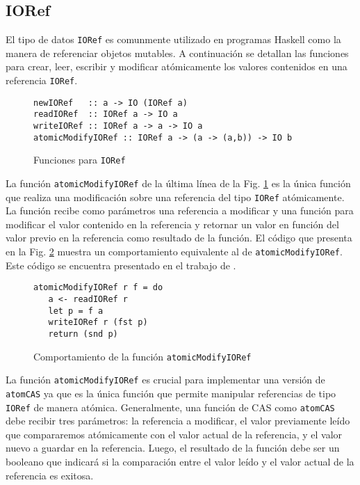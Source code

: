 \subsection{IORef}\label{sub:ioref}
El tipo de datos \texttt{IORef} es comunmente utilizado en programas Haskell como la manera de referenciar objetos mutables.
A continuación se detallan las funciones para crear, leer, escribir y modificar atómicamente los valores contenidos en una referencia \texttt{IORef}.

\begin{figure}[H]
\centering
\begin{verbatim}
newIORef   :: a -> IO (IORef a)
readIORef  :: IORef a -> IO a
writeIORef :: IORef a -> a -> IO a
atomicModifyIORef :: IORef a -> (a -> (a,b)) -> IO b
\end{verbatim}
\caption{Funciones para \texttt{IORef}}
\label{fig:ioref-interface}
\end{figure}

La función \texttt{atomicModifyIORef} de la última línea de la Fig. \ref{fig:ioref-interface} es la única función que realiza una modificación sobre una referencia del tipo \texttt{IORef} atómicamente.
La función recibe como parámetros una referencia a modificar y una función para modificar el valor contenido en la referencia y retornar un valor en función del valor previo en la referencia como resultado de la función. El código que presenta en la Fig. \ref{fig:atomicModifyIORef-behavior} muestra un comportamiento equivalente al de \texttt{atomicModifyIORef}. Este código se encuentra presentado en el trabajo de \cite{linked-list}.

\begin{figure}[tb]
\centering
\begin{verbatim}
atomicModifyIORef r f = do
   a <- readIORef r
   let p = f a
   writeIORef r (fst p)
   return (snd p)
\end{verbatim}
\caption{Comportamiento de la función \texttt{atomicModifyIORef}}
\label{fig:atomicModifyIORef-behavior}
\end{figure}

La función \texttt{atomicModifyIORef} es crucial para implementar una versión de \texttt{atomCAS} ya que es la única función que permite manipular referencias de tipo \texttt{IORef} de manera atómica.
Generalmente, una función de CAS como \texttt{atomCAS} debe recibir tres parámetros: la referencia a modificar, el valor previamente leído que compararemos atómicamente con el valor actual de la referencia, y el valor nuevo a guardar en la referencia.
Luego, el resultado de la función debe ser un booleano que indicará si la comparación entre el valor leído y el valor actual de la referencia es exitosa.

